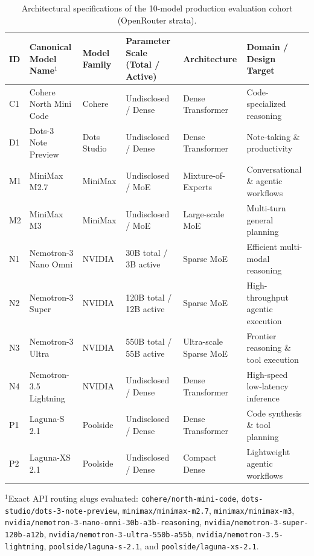 \begin{table}[!t]
\centering
\caption{Architectural specifications of the 10-model production evaluation cohort (OpenRouter strata).}
\label{tab:openrouter-models}
\footnotesize
\setlength{\tabcolsep}{5pt}
\begin{tabular}{@{}llllll@{}}
\toprule
ID & Canonical Model Name$^1$ & Model Family & Parameter Scale (Total / Active) & Architecture & Domain / Design Target \\
\midrule
C1 & Cohere North Mini Code & Cohere & Undisclosed / Dense & Dense Transformer & Code-specialized reasoning \\
D1 & Dots-3 Note Preview & Dots Studio & Undisclosed / Dense & Dense Transformer & Note-taking \& productivity \\
M1 & MiniMax M2.7 & MiniMax & Undisclosed / MoE & Mixture-of-Experts & Conversational \& agentic workflows \\
M2 & MiniMax M3 & MiniMax & Undisclosed / MoE & Large-scale MoE & Multi-turn general planning \\
N1 & Nemotron-3 Nano Omni & NVIDIA & 30B total / 3B active & Sparse MoE & Efficient multi-modal reasoning \\
N2 & Nemotron-3 Super & NVIDIA & 120B total / 12B active & Sparse MoE & High-throughput agentic execution \\
N3 & Nemotron-3 Ultra & NVIDIA & 550B total / 55B active & Ultra-scale Sparse MoE & Frontier reasoning \& tool execution \\
N4 & Nemotron-3.5 Lightning & NVIDIA & Undisclosed / Dense & Dense Transformer & High-speed low-latency inference \\
P1 & Laguna-S 2.1 & Poolside & Undisclosed / Dense & Dense Transformer & Code synthesis \& tool planning \\
P2 & Laguna-XS 2.1 & Poolside & Undisclosed / Dense & Compact Dense & Lightweight agentic workflows \\
\bottomrule
\end{tabular}
\vspace{3pt}\par\noindent\parbox{\linewidth}{\footnotesize $^1$Exact API routing slugs evaluated: \texttt{cohere/north-mini-code}, \texttt{dots-studio/dots-3-note-preview}, \texttt{minimax/minimax-m2.7}, \texttt{minimax/minimax-m3}, \texttt{nvidia/nemotron-3-nano-omni-30b-a3b-reasoning}, \texttt{nvidia/nemotron-3-super-120b-a12b}, \texttt{nvidia/nemotron-3-ultra-550b-a55b}, \texttt{nvidia/nemotron-3.5-lightning}, \texttt{poolside/laguna-s-2.1}, and \texttt{poolside/laguna-xs-2.1}.}
\end{table}

